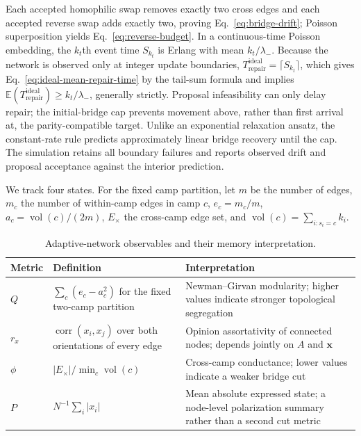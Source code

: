 \documentclass[10pt,a4paper]{article}
\newcommand{\E}{\mathbb{E}}
\begin{document}
Each accepted homophilic swap removes exactly two cross edges and each accepted reverse swap adds exactly two, proving Eq.~\eqref{eq:bridge-drift}; Poisson superposition yields Eq.~\eqref{eq:reverse-budget}. In a continuous-time Poisson embedding, the $k_t$th event time $S_{k_t}$ is Erlang with mean $k_t/\lambda_-$. Because the network is observed only at integer update boundaries, $T_{\mathrm{repair}}^{\mathrm{ideal}}=\lceil S_{k_t}\rceil$, which gives Eq.~\eqref{eq:ideal-mean-repair-time} by the tail-sum formula and implies $\E(T_{\mathrm{repair}}^{\mathrm{ideal}})\geq k_t/\lambda_-$, generally strictly. Proposal infeasibility can only delay repair; the initial-bridge cap prevents movement above, rather than first arrival at, the parity-compatible target. Unlike an exponential relaxation ansatz, the constant-rate rule predicts approximately linear bridge recovery until the cap. The simulation retains all boundary failures and reports observed drift and proposal acceptance against the interior prediction.

We track four states. For the fixed camp partition, let $m$ be the number of edges, $m_c$ the number of within-camp edges in camp $c$, $e_c=m_c/m$, $a_c=\operatorname{vol}(c)/(2m)$, $E_\times$ the cross-camp edge set, and $\operatorname{vol}(c)=\sum_{i:s_i=c}k_i$.
\begin{table}[!htbp]
\centering
\caption{Adaptive-network observables and their memory interpretation.}
\label{tab:network-metrics}
\small
\begin{tabularx}{\textwidth}{|p{1.2cm}|p{4.1cm}|Y|}
\hline
\textbf{Metric} & \textbf{Definition} & \textbf{Interpretation}\\
\hline
$Q$ & $\sum_c(e_c-a_c^2)$ for the fixed two-camp partition & Newman--Girvan modularity; higher values indicate stronger topological segregation\\
\hline
$r_x$ & $\operatorname{corr}(x_i,x_j)$ over both orientations of every edge & Opinion assortativity of connected nodes; depends jointly on $A$ and $\bm x$\\
\hline
$\phi$ & $|E_\times|/\min_c\operatorname{vol}(c)$ & Cross-camp conductance; lower values indicate a weaker bridge cut\\
\hline
$P$ & $N^{-1}\sum_i|x_i|$ & Mean absolute expressed state; a node-level polarization summary rather than a second cut metric\\
\hline
\end{tabularx}
\end{table}
\end{document}
